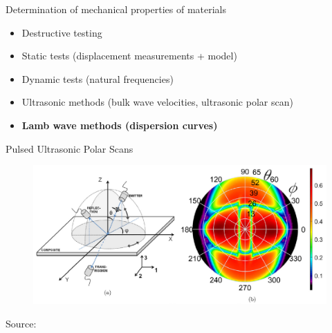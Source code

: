 \documentclass[10pt]{beamer} %
\begin{document}
\begin{frame}[label=frame2]{Determination of mechanical properties of materials}
  \begin{itemize}
  	\item Destructive testing
  	\item Static tests (displacement measurements + model)
  	\item Dynamic tests (natural frequencies)
  	\item Ultrasonic methods (bulk wave velocities, ultrasonic polar scan)
  	\item \textbf{Lamb wave methods (dispersion curves)}
  \end{itemize}
\end{frame}
\begin{frame}[label=frame3]{Pulsed Ultrasonic Polar Scans}
\begin{figure}
		\includegraphics[width=\textwidth]{Martens-Pulsed-Ultrasonic_Polar_Scan.png}
\end{figure}
 \begin{biblio}{Source:}
\end{biblio}
\end{frame}
\end{document}
